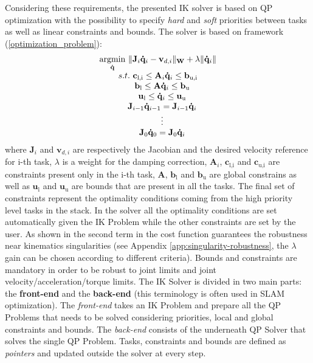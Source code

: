 Considering these requirements, the presented IK solver is based on QP optimization with the possibility to specify \emph{hard} and \emph{soft} priorities between tasks as well as linear constraints and bounds. 
The solver is based on framework (\ref{optimization_problem}):
\begin{equation} 
\label{optimization_problem2}
\begin{array}{c}
\underset{\mathbf{\dot{q}}}{\operatorname{argmin}} \ \Arrowvert \mathbf{J}_i \mathbf{\dot{q}}_i-\mathbf{v}_{d,i} \Arrowvert_{\mathbf{W}} + \lambda \Arrowvert \mathbf{\dot{q}}_i \Arrowvert\\
s.t. \ \mathbf{c}_\text{l,i} \leq \mathbf{A}_i\mathbf{\dot{q}}_i \leq \mathbf{b}_\text{u,i}\\
\ \ \ \mathbf{b}_\text{l} \leq \mathbf{A}\mathbf{\dot{q}}_i \leq \mathbf{b}_\text{u}\\
\ \ \ \mathbf{u}_\text{l} \leq \mathbf{\dot{q}}_i \leq \mathbf{u}_\text{u}\\
\ \ \ \mathbf{J}_{i-1}\mathbf{\dot{q}}_{i-1} = \mathbf{J}_{i-1}\mathbf{\dot{q}}_i\\
\ \ \ \vdots \\
\ \ \ \mathbf{J}_{0}\mathbf{\dot{q}}_{0} = \mathbf{J}_{0}\mathbf{\dot{q}}_i
\end{array}
\end{equation}
where $\mathbf{J}_i$ and $\mathbf{v}_{d,i}$ are respectively the Jacobian and the desired velocity reference for i-th task, $\lambda$ is a weight for the damping correction, $\mathbf{A}_i$, $\mathbf{c}_\text{l,i}$ and $\mathbf{c}_\text{u,i}$ are constraints present only in the i-th task, $\mathbf{A}$, $\mathbf{b}_\text{l}$ and $\mathbf{b}_\text{u}$ are global constrains as well as $\mathbf{u}_\text{l}$ and $\mathbf{u}_\text{u}$ are bounds that are present in all the tasks. 
The final set of constraints represent the optimality conditions coming from the high priority level tasks in the stack. In the solver all the optimality conditions are set automatically given the IK Problem while the other constraints are set by the user.
As shown in \cite{Nakamura:90} the second term in the cost function guarantees the robustness near kinematics singularities (see Appendix \ref{app:singularity-robustness}, the $\lambda$ gain can be chosen according to different criteria). Bounds and constraints are mandatory in order to be robust to joint limits and joint velocity/acceleration/torque limits.
The IK Solver is divided in two main parts: the \textbf{front-end} and the \textbf{back-end} (this terminology is often used in SLAM optimization).
The \emph{front-end} takes an IK Problem and prepare all the QP Problems that needs to be solved considering priorities, local and global constraints and bounds. The \emph{back-end} consists of the underneath QP Solver that solves the single QP Problem. Tasks, constraints and bounds are defined as \emph{pointers} and updated outside the solver at every step.

